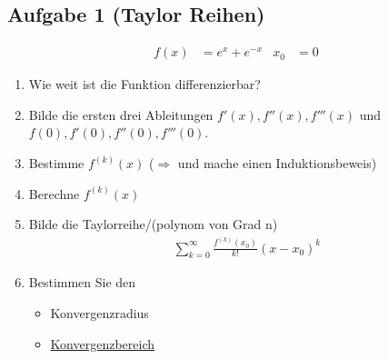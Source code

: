 \subsection{Aufgabe 1 (Taylor Reihen)}
\begin{align*}
    f(x) &= e^x + e^{-x} & x_0 &= 0
\end{align*}
\begin{enumerate}[label=Schritt \arabic*: ]
    \item Wie weit ist die Funktion differenzierbar?
    \item Bilde die ersten drei Ableitungen $f'(x), f''(x), f'''(x)$ und $f(0), f'(0), f''(0), f'''(0)$.
    \item Bestimme $f^{(k)}(x)$ ($\Rightarrow$ und mache einen Induktionsbeweis)
    \item Berechne $f^{(k)}(x)$
    \item Bilde die Taylorreihe/(polynom von Grad n)
    \begin{align*}
        \sum_{k = 0}^{\infty} \frac{f^{(k)}(x_0)}{k!} (x - x_0)^k
    \end{align*}
    \item Bestimmen Sie den
    \begin{itemize}
        \item Konvergenzradius
        \item \underline{Konvergenzbereich}
    \end{itemize}
\end{enumerate}

